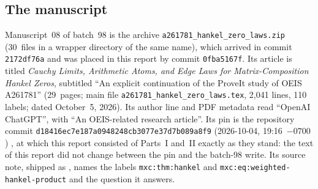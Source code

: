 \documentclass[11pt]{article}
\numberwithin{equation}{section}
\theoremstyle{definition}
\theoremstyle{remark}
\begin{document}
\subsection{The manuscript}
Manuscript~08 of batch~98 is the archive
\nolinkurl{a261781_hankel_zero_laws.zip} (30~files in a wrapper directory
of the same name), which arrived in commit \texttt{2172df76a} and was
placed in this report by commit \texttt{0fba5167f}. Its article is titled
\emph{Cauchy Limits, Arithmetic Atoms, and Edge Laws for
Matrix-Composition Hankel Zeros}, subtitled ``An explicit continuation of
the ProveIt study of OEIS A261781'' (29~pages; main file
\texttt{a261781\_hankel\_zero\_laws.tex}, 2,041 lines, 110 labels; dated
October~5, 2026). Its author line and PDF metadata read ``OpenAI
ChatGPT'', with ``An OEIS-related research article''. Its pin is the
repository commit \texttt{d18416ec7e187a0948248cb3077e37d7b089a8f9}
(2026-10-04, 19:16~$-0700$) \cite{hzProveIt}, at which this report
consisted of Parts~I and~II exactly as they stand: the text of this report
did not change between the pin and the batch-98 write. Its source note, shipped
as , names the labels
\texttt{mxc:thm:hankel} and \texttt{mxc:eq:weighted-hankel-product} and the
question it answers.
\end{document}
